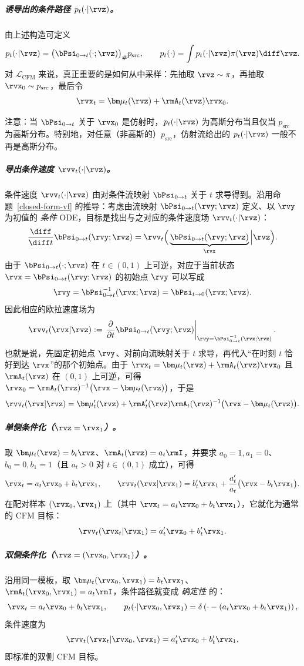 \subparagraph{诱导出的条件路径 $p_t(\cdot|\rvz)$。}
由上述构造可定义
\[
p_t(\cdot|\rvz) = \bigl(\bPsi_{0\to t}( \cdot ;\rvz)\bigr)_{\#} p_{\mathrm{src}},
\qquad
p_t(\cdot)  =  \int p_t(\cdot|\rvz)\pi(\rvz)\diff\rvz.
\]
对 $\mathcal{L}_{\mathrm{CFM}}$ 来说，真正重要的是如何从中采样：先抽取 $\rvz \sim \pi$，再抽取 $\rvx_0 \sim p_{\mathrm{src}}$，最后令
\[
\rvx_t = \bm\mu_t(\rvz) + \rmA_t(\rvz)\rvx_0.
\]


注意：当 $\bPsi_{0\to t}$ 关于 $\rvx_0$ 是仿射时，$p_t( \cdot | \rvz)$ 为高斯分布当且仅当 $p_{\mathrm{src}}$ 为高斯分布。特别地，对任意（非高斯的）$p_{\mathrm{src}}$，仿射流给出的 $p_t(\cdot|\rvz)$ 一般不再是高斯分布。


\subparagraph{导出条件速度 $\rvv_t(\cdot|\rvz)$。} 条件速度 $\rvv_t(\cdot|\rvz)$ 由对条件流映射 $\bPsi_{0\to t}$ 关于 $t$ 求导得到。沿用命题~\ref{closed-form-vf} 的推导：考虑由流映射 $\bPsi_{0\to t}(\rvy;\rvz)$ 定义、以 $\rvy$ 为初值的 \emph{条件} ODE，目标是找出与之对应的条件速度场 $\rvv_t(\cdot|\rvz)$：
\[
\frac{\diff}{\diff t} \bPsi_{0\to t}(\rvy;\rvz)
= \rvv_t \Big(\underbrace{\bPsi_{0\to t}(\rvy;\rvz)}_{\rvx} \Big| \rvz\Big).
\]
由于 $\bPsi_{0\to t}(\cdot;\rvz)$ 在 $t\in(0,1)$ 上可逆，对应于当前状态 $\rvx=\bPsi_{0\to t}(\rvy;\rvz)$ 的初始点 $\rvy$ 可以写成
\[
\rvy
=
\bPsi_{0\to t}^{-1}(\rvx;\rvz)
=
\bPsi_{t\to0}(\rvx;\rvz).
\]
因此相应的欧拉速度场为
\[
\rvv_t(\rvx|\rvz)
:=
\left.
\frac{\partial}{\partial t}
\bPsi_{0\to t}(\rvy;\rvz)
\right|_{\rvy=\bPsi_{0\to t}^{-1}(\rvx;\rvz)}.
\]
也就是说，先固定初始点 $\rvy$、对前向流映射关于 $t$ 求导，再代入“在时刻 $t$ 恰好到达 $\rvx$”的那个初始点。由于 $\rvx_t=\bm\mu_t(\rvz)+\rmA_t(\rvz)\rvx_0$ 且 $\rmA_t(\rvz)$ 在 $(0,1)$ 上可逆，可得 $\rvx_0=\rmA_t(\rvz)^{-1}\bigl(\rvx-\bm\mu_t(\rvz)\bigr)$，于是
\[
\rvv_t(\rvx|\rvz)
 =
\bm\mu_t'(\rvz) + \rmA_t'(\rvz) \rmA_t(\rvz)^{-1} \bigl(\rvx-\bm\mu_t(\rvz)\bigr).
\]


\subparagraph{单侧条件化（$\rvz=\rvx_1$）。}
取 $\bm\mu_t(\rvz)=b_t \rvz$、$\rmA_t(\rvz)=a_t \rmI$，并要求 $a_0=1,a_1=0$、$b_0=0,b_1=1$（且 $a_t>0$ 对 $t\in(0,1)$ 成立），可得
\[
\rvx_t = a_t \rvx_0 + b_t \rvx_1,
\qquad
\rvv_t(\rvx|\rvx_1) = b_t' \rvx_1 + \frac{a_t'}{a_t} \bigl(\rvx-b_t\rvx_1\bigr).
\]
在配对样本 $(\rvx_0,\rvx_1)$ 上（其中 $\rvx_t=a_t\rvx_0+b_t\rvx_1$），它就化为通常的 CFM 目标：
\[
\rvv_t(\rvx_t|\rvx_1)=a_t' \rvx_0 + b_t' \rvx_1.
\]

\subparagraph{双侧条件化（$\rvz=(\rvx_0,\rvx_1)$）。}
沿用同一模板，取 $\bm\mu_t(\rvx_0,\rvx_1)=b_t \rvx_1$、$\rmA_t(\rvx_0,\rvx_1)=a_t \rmI$，条件路径就变成 \emph{确定性} 的：
\[
\rvx_t=a_t \rvx_0+b_t \rvx_1,
\qquad
p_t(\cdot|\rvx_0,\rvx_1)=\delta\left(\cdot - (a_t\rvx_0+b_t\rvx_1)\right),
\]
条件速度为
\[
\rvv_t(\rvx_t|\rvx_0,\rvx_1)=a_t' \rvx_0+b_t' \rvx_1,
\]
即标准的双侧 CFM 目标。

